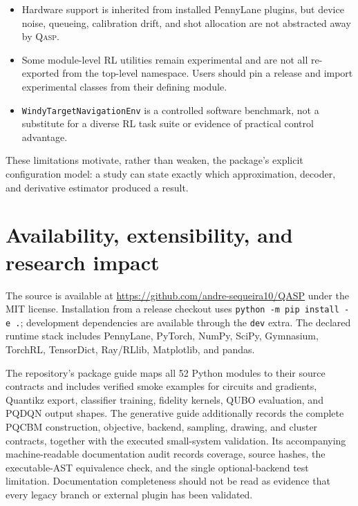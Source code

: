 \documentclass[10pt]{article}
\newcommand{\qasp}{\textsc{Qasp}}
\newcommand{\code}[1]{\texttt{#1}}
\newcommand{\repo}{\url{https://github.com/andre-sequeira10/QASP}}
\begin{document}
\begin{itemize}
  \item Hardware support is inherited from installed PennyLane plugins, but device noise, queueing, calibration drift, and shot allocation are not abstracted away by \qasp{}.
  \item Some module-level RL utilities remain experimental and are not all re-exported from the top-level namespace.  Users should pin a release and import experimental classes from their defining module.
  \item \code{WindyTargetNavigationEnv} is a controlled software benchmark,
        not a substitute for a diverse RL task suite or evidence of practical
        control advantage.
\end{itemize}

These limitations motivate, rather than weaken, the package's explicit configuration model: a study can state exactly which approximation, decoder, and derivative estimator produced a result.

\section{Availability, extensibility, and research impact}
\label{sec:availability}

The source is available at \repo{} under the MIT license.  Installation from a release checkout uses \code{python -m pip install -e .}; development dependencies are available through the \code{dev} extra.  The declared runtime stack includes PennyLane, PyTorch, NumPy, SciPy, Gymnasium, TorchRL, TensorDict, Ray/RLlib, Matplotlib, and pandas.

The repository's package guide maps all 52 Python modules to their source
contracts and includes verified smoke examples for circuits and gradients,
Quantikz export, classifier training, fidelity kernels, QUBO evaluation, and
PQDQN output shapes.  The generative guide additionally records the complete
PQCBM construction, objective, backend, sampling, drawing, and cluster
contracts, together with the executed small-system validation.  Its
accompanying machine-readable documentation audit
records coverage, source hashes, the executable-AST equivalence check, and the
single optional-backend test limitation.  Documentation completeness should
not be read as evidence that every legacy branch or external plugin has been
validated.
\end{document}
